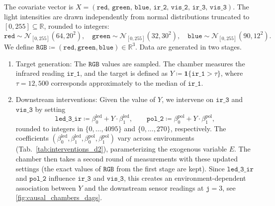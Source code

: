 The covariate vector is $X = (\mathtt{red},\, \mathtt{green},\, \mathtt{blue},\,  \mathtt{ir\_2},\, \allowbreak \mathtt{vis\_2},\,  \mathtt{ir\_3},\, \mathtt{vis\_3})$. The light intensities are drawn independently from normal distributions truncated to $[0,255] \subseteq \mathbb{R}$, rounded to integers:
\[
    \mathtt{red} \sim \mathcal{N}_{[0,255]}(64, 20^2),\quad
    \mathtt{green} \sim \mathcal{N}_{[0,255]}(32, 30^2),\quad
    \mathtt{blue} \sim \mathcal{N}_{[0,255]}(90, 12^2).
\]
We define $\mathtt{RGB} \coloneq (\mathtt{red}, \mathtt{green}, \mathtt{blue}) \in \mathbb{R}^3$. Data are generated in two stages.
\begin{enumerate}
    \item Target generation: The $\mathtt{RGB}$ values are sampled. The chamber measures the infrared reading $\mathtt{ir\_1}$, and the target is defined as $Y \coloneq \bm{1}\{\mathtt{ir\_1} > \tau\}$, where $\tau = 12{,}500$ corresponds approximately to the median of $\mathtt{ir\_1}$.
 
    \item Downstream interventions: Given the value of $Y$, we intervene on $\mathtt{ir\_3}$ and $\mathtt{vis\_3}$
    by setting
    \[
        \mathtt{led\_3\_ir} \coloneq \beta^{\mathrm{led}}_0 + Y \cdot \beta^{\mathrm{led}}_1,
        \qquad
        \mathtt{pol\_2} \coloneq \beta^{\mathrm{pol}}_0 + Y \cdot \beta^{\mathrm{pol}}_1,
    \]
    rounded to integers in $\{0, \dots, 4095\}$ and $\{0, \ldots, 270\}$, respectively. The coefficients $(\beta^{\mathrm{led}}_0, \beta^{\mathrm{led}}_1, \beta^{\mathrm{pol}}_0, \beta^{\mathrm{pol}}_1)$ vary across environments (Tab.~\ref{tab:interventions_d2}), parameterizing the exogenous variable $E$. The chamber then takes a second round of measurements with these updated settings (the exact values of $\mathtt{RGB}$ from the first stage are kept). Since $\mathtt{led\_3\_ir}$ and $\mathtt{pol\_2}$ influence $\mathtt{ir\_3}$ and $\mathtt{vis\_3}$, this creates an environment-dependent association between $Y$ and the downstream sensor readings at $\mathtt{j}=3$, see \cref{fig:causal_chambers_dags}.
\end{enumerate}


